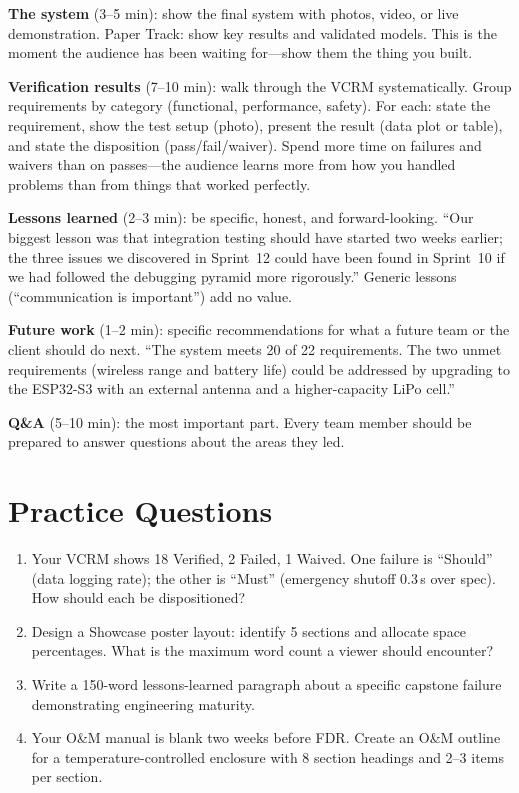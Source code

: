 \textbf{The system} (3--5 min): show the final system with photos, video, or live demonstration. Paper Track: show key results and validated models. This is the moment the audience has been waiting for---show them the thing you built.

\textbf{Verification results} (7--10 min): walk through the VCRM systematically. Group requirements by category (functional, performance, safety). For each: state the requirement, show the test setup (photo), present the result (data plot or table), and state the disposition (pass/fail/waiver). Spend more time on failures and waivers than on passes---the audience learns more from how you handled problems than from things that worked perfectly.

\textbf{Lessons learned} (2--3 min): be specific, honest, and forward-looking. ``Our biggest lesson was that integration testing should have started two weeks earlier; the three issues we discovered in Sprint~12 could have been found in Sprint~10 if we had followed the debugging pyramid more rigorously.'' Generic lessons (``communication is important'') add no value.

\textbf{Future work} (1--2 min): specific recommendations for what a future team or the client should do next. ``The system meets 20 of 22 requirements. The two unmet requirements (wireless range and battery life) could be addressed by upgrading to the ESP32-S3 with an external antenna and a higher-capacity LiPo cell.''

\textbf{Q\&A} (5--10 min): the most important part. Every team member should be prepared to answer questions about the areas they led.


\section{Practice Questions}
\begin{enumerate}[leftmargin=1.5em]
\item Your VCRM shows 18 Verified, 2 Failed, 1 Waived. One failure is ``Should'' (data logging rate); the other is ``Must'' (emergency shutoff 0.3\,s over spec). How should each be dispositioned?
\item Design a Showcase poster layout: identify 5 sections and allocate space percentages. What is the maximum word count a viewer should encounter?
\item Write a 150-word lessons-learned paragraph about a specific capstone failure demonstrating engineering maturity.
\item Your O\&M manual is blank two weeks before FDR. Create an O\&M outline for a temperature-controlled enclosure with 8 section headings and 2--3 items per section.
\end{enumerate}



